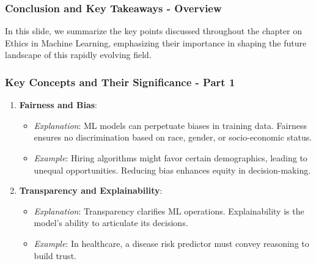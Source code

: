 \documentclass[aspectratio=169]{beamer}
\begin{document}
\begin{frame}[fragile]
    \frametitle{Conclusion and Key Takeaways - Overview}
    In this slide, we summarize the key points discussed throughout the chapter on Ethics in Machine Learning, emphasizing their importance in shaping the future landscape of this rapidly evolving field.
\end{frame}

\begin{frame}[fragile]
    \frametitle{Key Concepts and Their Significance - Part 1}
    \begin{enumerate}
        \item \textbf{Fairness and Bias}:
        \begin{itemize}
            \item \textit{Explanation}: ML models can perpetuate biases in training data. Fairness ensures no discrimination based on race, gender, or socio-economic status.
            \item \textit{Example}: Hiring algorithms might favor certain demographics, leading to unequal opportunities. Reducing bias enhances equity in decision-making.
        \end{itemize}
    
        \item \textbf{Transparency and Explainability}:
        \begin{itemize}
            \item \textit{Explanation}: Transparency clarifies ML operations. Explainability is the model's ability to articulate its decisions.
            \item \textit{Example}: In healthcare, a disease risk predictor must convey reasoning to build trust.
        \end{itemize}
    \end{enumerate}
\end{frame}
\end{document}
